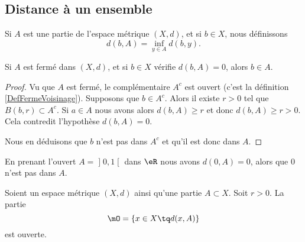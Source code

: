 \subsection{Distance à un ensemble}

\begin{definition}      \label{DEFooGNNUooFUZINs}
    Si \( A\) est une partie de l'espace métrique \( (X,d)\), et si \( b\in X\), nous définissons
    \begin{equation}
        d(b,A)=\inf_{y\in A}d(b,y).
    \end{equation}
\end{definition}

\begin{lemma}        \label{LEMooAIARooQADaxM}
    Si \( A\) est fermé dans \( (X,d)\), et si \( b\in X\) vérifie \( d(b,A)=0\), alors \( b\in A\).
\end{lemma}

\begin{proof}
    Vu que \( A\) est fermé, le complémentaire \( A^c\) est ouvert (c'est la définition \ref{DefFermeVoisinage}). Supposons que \( b\in A^c\). Alors il existe \( r>0\) tel que \( B(b,r)\subset A^c\). Si \( a\in A\) nous avons alors \( d(b,A)\geq r\) et donc \( d(b,A)\geq r>0\). Cela contredit l'hypothèse \( d(b,A)=0\).

    Nous en déduisons que \( b\) n'est pas dans \( A^c\) et qu'il est donc dans \( A\).
\end{proof}


\begin{example}
    En prenant l'ouvert \( A=\mathopen] 0 , 1 \mathclose[\) dans \( \eR\) nous avons \( d(0,A)=0\), alors que \( 0\) n'est pas dans \( A\).
\end{example}

\begin{lemma}    \label{LEMooJNRTooZyKiFC}
    Soient un espace métrique \( (X,d)\) ainsi qu'une partie \( A\subset X\). Soit \( r>0\). La partie
    \begin{equation}
        \mO=\{ x\in X\tq d(x,A) \}
    \end{equation}
    est ouverte.
\end{lemma}

